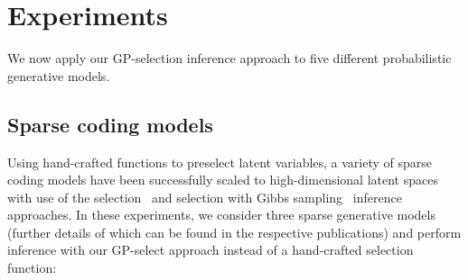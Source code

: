 \section{Experiments}
\label{exps}
%
We now apply our GP-selection inference approach to five different probabilistic generative models.

\subsection{Sparse coding models}
Using hand-crafted functions to preselect latent variables, a variety of sparse coding models have been successfully scaled to high-dimensional  latent spaces with use of the selection~\citep{HennigesEtAl2010, BornscheinEtAl2013, SheikhEtAl2014} and selection with Gibbs sampling~\citep{SheltonEtAl2011, SheltonEtAl2012} inference approaches.
In these experiments, we consider three sparse generative models (further details of which can be found in the respective publications) and perform inference with our GP-select approach instead of a hand-crafted selection function:
%
